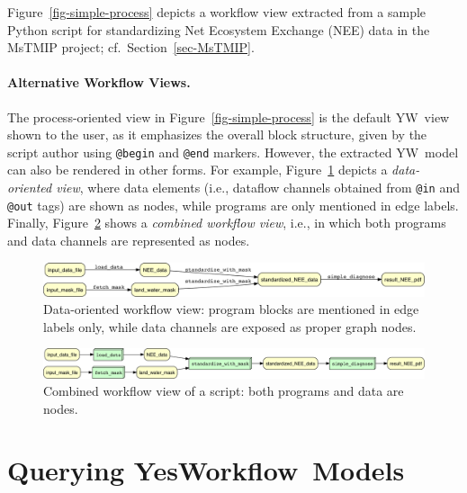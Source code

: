 \documentclass[15]{idcc}
\newcommand{\yw}{\textsf{YW}}
\newcommand{\YWT}{YesWorkflow}
\newcommand{\ywa}[1]{\texttt{\small #1}}
\newcommand{\figref}[1]{Figure~\ref{#1}}
\begin{document}
 \noindent \figref{fig-simple-process} depicts a workflow view
 extracted from a sample Python script for standardizing Net Ecosystem
 Exchange (NEE) data in the MsTMIP project; cf.~Section~\ref{sec-MsTMIP}.

\paragraph{Alternative Workflow Views.}
The process-oriented view in \figref{fig-simple-process} is the
default \yw\ view shown to the user, as it emphasizes the overall
block structure, given by the script author using \ywa{@begin} and
\ywa{@end} markers.  However, the extracted \yw\ model can also be
rendered in other forms.  For example, \figref{fig-simple-data}
depicts a \emph{data-oriented view}, where data elements (i.e.,
dataflow channels obtained from \ywa{@in} and \ywa{@out} tags) are
shown as nodes, while programs are only mentioned in edge labels.
Finally, \figref{fig-simple-combined} shows a \emph{combined workflow
  view}, i.e., in which both programs and data channels are
represented as nodes.

 \begin{figure}[t]
   \centering
   \includegraphics[width=1.0\textwidth]{figures/example_data-crop.pdf}
   \caption{Data-oriented workflow view: program blocks are mentioned
     in edge labels only, while data channels are exposed as proper
     graph nodes.}
   \label{fig-simple-data}
 \end{figure}

 \begin{figure}[h]
   \centering
   \includegraphics[width=1.0\textwidth]{figures/example_comb-crop.pdf}
   \caption{Combined workflow view of a script: both programs and data
   are nodes.}
   \label{fig-simple-combined}
 \end{figure}



\section{Querying \YWT\ Models}\label{sec-querying}
\end{document}
